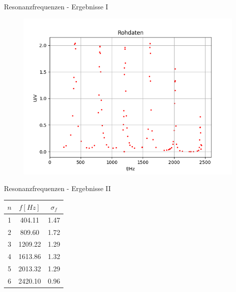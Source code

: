 \documentclass[14pt]{beamer}
\begin{document}
\begin{frame}{Resonanzfrequenzen - Ergebnisse I}
\begin{figure}
\includegraphics[scale=0.5]{rohres}
\end{figure}
\end{frame}

\begin{frame}{Resonanzfrequenzen - Ergebnisse II}
\begin{table}
\begin{tabular}{|c|c|c|}
\hline 
$n$ & $f[Hz]$ & $\sigma_f$ \\ 
\hline 
1 & 404.11 & 1.47 \\ 
\hline 
2 & 809.60 & 1.72 \\ 
\hline 
3 & 1209.22 & 1.29 \\ 
\hline 
4 & 1613.86 & 1.32 \\ 
\hline 
5 & 2013.32 & 1.29 \\ 
\hline 
6 & 2420.10 & 0.96 \\ 
\hline
\end{tabular} 
\end{table}
\end{frame}
\end{document}
